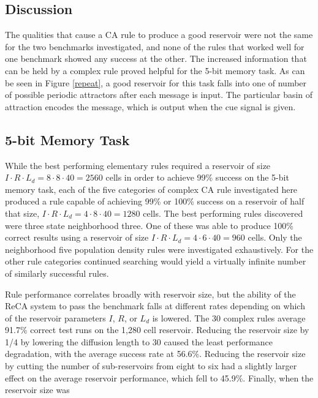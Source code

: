 \documentclass{elsarticle}
\begin{document}
\begin{multicols}{2}
\section{Discussion}\label{discussion}
The qualities that cause a CA rule to produce a good reservoir were not the 
   same for the two benchmarks investigated, and none of the rules that worked 
   well for one benchmark showed any success at the other. The increased 
   information that can be held by a complex rule proved helpful for the 5-bit 
   memory task. As can be seen in Figure \ref{repeat}, a good reservoir for 
   this task falls into one of number of possible  periodic attractors after 
   each message is input. The particular basin of attraction encodes the 
   message, which is output when the cue signal is given. 
   
   \subsection{5-bit Memory Task}
While the best performing elementary rules required a reservoir of size $I \cdot R 
\cdot L_{d} = 8 \cdot 8 \cdot 40 = 2560$ cells in order to achieve 99\% success on the 
5-bit memory task, each of the five categories of complex CA rule investigated 
here produced a rule capable of achieving 99\% or 100\% success on a reservoir 
of half that size, $I \cdot R \cdot L_{d} = 4 \cdot 8 \cdot 40 = 1280$ cells. The best 
performing rules discovered were three state neighborhood three. One of these 
was able to produce 100\% correct results using a reservoir of size $I \cdot R \cdot 
L_{d} = 4 \cdot 6 \cdot 40 = 960$ cells. Only the neighborhood five population density 
rules were investigated exhaustively.  For the other rule categories continued 
searching would yield a virtually infinite number of similarly successful 
rules. \par Rule performance correlates broadly with reservoir size, but the 
ability of the ReCA system to  pass the benchmark falls at different rates 
depending on which of the reservoir parameters $I$, $R$, or $L_{d}$ is lowered.  
The 30 complex rules average 91.7\% correct test runs on the 1,280 cell 
reservoir.  Reducing the reservoir size by 1/4 by lowering the diffusion length 
to 30 caused the least performance degradation, with the average success rate 
at 56.6\%. Reducing the reservoir size by cutting the number of sub-reservoirs 
from eight to six had a slightly larger effect on the average reservoir 
performance, which fell to 45.9\%.  Finally, when the reservoir size was 

\end{multicols}
\end{document}
